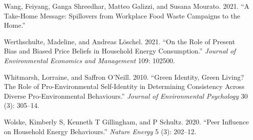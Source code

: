 \documentclass[
  12pt,
  captions=heading]{scrreport}
\newlength{\cslhangindent}
\newlength{\cslentryspacingunit} %
\newenvironment{CSLReferences}[2] %
 {%
  \setlength{\parindent}{0pt}
  \ifodd #1
  \let\oldpar\par
  \def\par{\hangindent=\cslhangindent\oldpar}
  \fi
  \setlength{\parskip}{#2\cslentryspacingunit}
 }%
 {}
\begin{document}
\begin{CSLReferences}{1}{0}
\leavevmode{}%
Wang, Feiyang, Ganga Shreedhar, Matteo Galizzi, and Susana Mourato.
2021. {``A Take-Home Message: Spillovers from Workplace Food Waste
Campaigns to the Home.''}

\leavevmode{}%
Werthschulte, Madeline, and Andreas Löschel. 2021. {``On the Role of
Present Bias and Biased Price Beliefs in Household Energy
Consumption.''} \emph{Journal of Environmental Economics and Management}
109: 102500.

\leavevmode{}%
Whitmarsh, Lorraine, and Saffron O'Neill. 2010. {``Green Identity, Green
Living? The Role of Pro-Environmental Self-Identity in Determining
Consistency Across Diverse Pro-Environmental Behaviours.''}
\emph{Journal of Environmental Psychology} 30 (3): 305--14.

\leavevmode{}%
Wolske, Kimberly S, Kenneth T Gillingham, and P Schultz. 2020. {``Peer
Influence on Household Energy Behaviours.''} \emph{Nature Energy} 5 (3):
202--12.

\end{CSLReferences}
\end{document}
